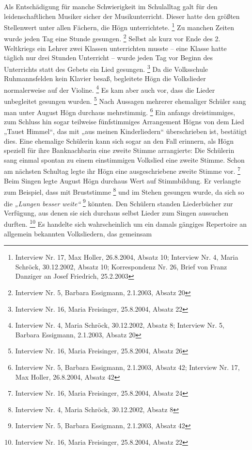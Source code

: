 \documentclass[a4paper]{article}
\newcommand\textstyleZitate[1]{\textit{#1}}
\newcommand\textstyleFootnoteSymbol[1]{\textsuperscript{#1}}
\begin{document}
Als Entschädigung für manche Schwierigkeit im Schulalltag galt für den
leidenschaftlichen Musiker sicher der Musikunterricht. Dieser hatte den
größten Stellenwert unter allen Fächern, die Högn
unterrichtete. \footnote{Interview Nr. 17, Max Holler, 26.8.2004,
Absatz 10; Interview Nr. 4, Maria Schröck, 30.12.2002, Absatz 10;
Korrespondenz Nr. 26, Brief von Franz Danziger an Josef Friedrich,
25.2.2003} Zu manchen Zeiten wurde jeden Tag eine Stunde
gesungen. \footnote{Interview Nr. 5, Barbara Essigmann, 2.1.2003,
Absatz 20} Selbst als kurz vor Ende des 2. Weltkriegs ein Lehrer zwei
Klassen unterrichten musste – eine Klasse hatte täglich nur drei
Stunden Unterricht – wurde jeden Tag vor Beginn des Unterrichts statt
des Gebets ein Lied gesungen. \footnote{Interview Nr. 16, Maria
Freisinger, 25.8.2004, Absatz 22} Da die Volksschule Ruhmannsfelden
kein Klavier besaß, begleitete Högn die Volkslieder normalerweise auf
der Violine. \footnote{Interview Nr. 4, Maria Schröck, 30.12.2002,
Absatz 8; Interview Nr. 5, Barbara Essigmann, 2.1.2003, Absatz 20} Es
kam aber auch vor, dass die Lieder unbegleitet gesungen
wurden. \footnote{Interview Nr. 16, Maria Freisinger, 25.8.2004, Absatz
26} Nach Aussagen mehrerer ehemaliger Schüler sang man unter August
Högn durchaus mehrstimmig. \footnote{Interview Nr. 5, Barbara
Essigmann, 2.1.2003, Absatz 42; Interview Nr. 17, Max Holler,
26.8.2004, Absatz 42} Ein anfangs dreistimmiges, zum Schluss hin sogar
teilweise fünfstimmiges Arrangement Högns von dem Lied „Tauet Himmel“,
das mit „aus meinen Kinderliedern“ überschrieben ist, bestätigt dies.
Eine ehemalige Schülerin kann sich sogar an den Fall erinnern, als Högn
speziell für ihre Banknachbarin eine zweite Stimme arrangierte: Die
Schülerin sang einmal spontan zu einem einstimmigen Volkslied eine
zweite Stimme. Schon am nächsten Schultag legte ihr Högn eine
ausgeschriebene zweite Stimme vor. \footnote{Interview Nr. 16, Maria
Freisinger, 25.8.2004, Absatz 24} Beim Singen legte August Högn
durchaus Wert auf Stimmbildung. Er verlangte zum Beispiel, dass mit
Bruststimme \footnote{Interview Nr. 4, Maria Schröck, 30.12.2002,
Absatz 8} und im Stehen gesungen wurde, da sich so die
\textstyleZitate{„Lungen besser weite“}\textstyleFootnoteSymbol{
} \footnote{Interview Nr. 5, Barbara Essigmann, 2.1.2003, Absatz
42}\textstyleZitate{ }könnten. Den Schülern standen Liederbücher zur
Verfügung, aus denen sie sich durchaus selbst Lieder zum Singen
aussuchen durften. \footnote{Interview Nr. 16, Maria Freisinger,
25.8.2004, Absatz 22} Es handelte sich wahrscheinlich um ein damals
gängiges Repertoire an allgemein bekannten Volksliedern, das gemeinsam
\end{document}
